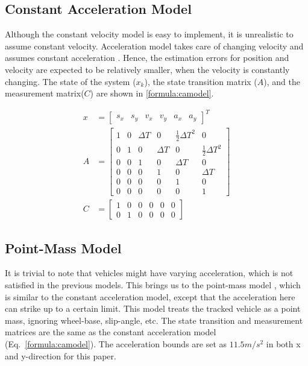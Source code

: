\subsection{Constant Acceleration Model}
Although the constant velocity model is easy to implement, it is unrealistic to assume constant velocity. Acceleration model takes care of changing velocity and assumes constant acceleration \cite{Schubert2008}. Hence, the estimation errors for position and velocity are expected to be relatively smaller, when the velocity is constantly changing. The state of the system ($x_k$), the state transition matrix ($A$), and the measurement matrix($C$) are shown in \eqref{formula:camodel}.

\begin{equation}
\label{formula:camodel}
\begin{split}
x&= \left[\begin{matrix}
s_x & s_y & v_x & v_y & a_x & a_y
\end{matrix}\right]^{T}\\
A&= \left[\begin{matrix}
1 & 0 & \Delta T & 0 & \frac{1}{2}\Delta T^2 & 0\\
0 & 1 & 0 & \Delta T & 0 & \frac{1}{2}\Delta T^2 \\
0 & 0 & 1 & 0 & \Delta T & 0\\
0 & 0 & 0 & 1 & 0 & \Delta T\\
0 & 0 & 0 & 0 & 1 & 0\\
0 & 0 & 0 & 0 & 0 & 1
\end{matrix}\right] \\
C&= \left[\begin{matrix}
1 & 0 & 0 & 0 & 0 & 0\\
0 & 1 & 0 & 0 & 0 & 0
\end{matrix}\right]
\end{split}
\end{equation}

\subsection{Point-Mass Model}
It is trivial to note that vehicles might have varying acceleration, which is not satisfied in the previous models. This brings us to the point-mass model \cite{Althoff}, which is similar to the constant acceleration model, except that the acceleration here can strike up to a certain limit. This model treats the tracked vehicle as a point mass, ignoring wheel-base, slip-angle, etc. The state transition and measurement matrices are the same as the constant acceleration model (Eq.~\eqref{formula:camodel}). The acceleration bounds are set as $11.5 m/s^2$ \cite{Althoff} in both x and y-direction for this paper.

